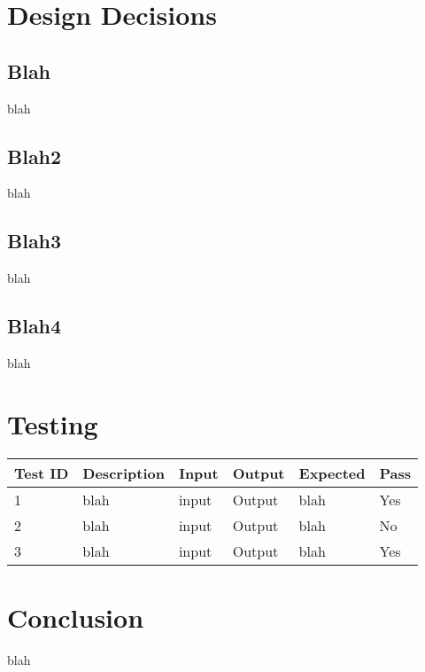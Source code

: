\documentclass[pdftex,12pt,a4paper]{article}
\begin{document}
\section{Design Decisions}
\subsection{Blah}
blah
\subsection{Blah2}
blah
\subsection{Blah3}
blah
\subsection{Blah4}
blah

\section{Testing}
\begin{tabular}{| l | l | l | l | l | l |}
\hline
Test ID & Description & Input & Output & Expected & Pass \\
\hline
1 & blah & input & Output & blah & Yes \\
\hline
2 & blah & input & Output & blah & No \\
\hline
3 & blah & input  & Output & blah & Yes \\
\hline
\end{tabular}

\section{Conclusion}
blah
\end{document}
